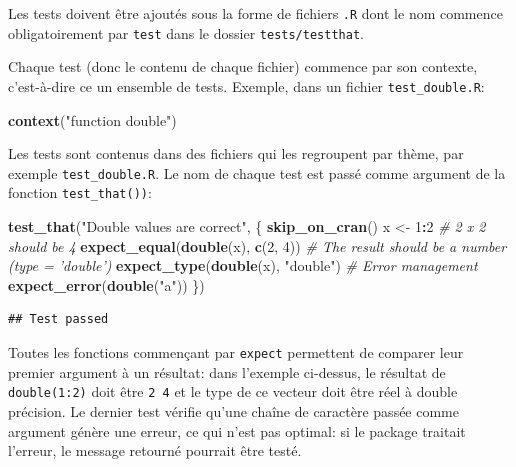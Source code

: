 \documentclass[
  12pt,
  french,
  a4paper,
  extrafontsizes,onecolumn,openright
  ]{memoir}
\newenvironment{Shaded}{\begin{snugshade}}{\end{snugshade}}
\newcommand{\CommentTok}[1]{\textcolor[rgb]{0.56,0.35,0.01}{\textit{#1}}}
\newcommand{\DecValTok}[1]{\textcolor[rgb]{0.00,0.00,0.81}{#1}}
\newcommand{\KeywordTok}[1]{\textcolor[rgb]{0.13,0.29,0.53}{\textbf{#1}}}
\newcommand{\NormalTok}[1]{#1}
\newcommand{\OperatorTok}[1]{\textcolor[rgb]{0.81,0.36,0.00}{\textbf{#1}}}
\newcommand{\StringTok}[1]{\textcolor[rgb]{0.31,0.60,0.02}{#1}}
\begin{document}
\normalsize

Les tests doivent être ajoutés sous la forme de fichiers \texttt{.R} dont le nom commence obligatoirement par \texttt{test} dans le dossier \texttt{tests/testthat}.

Chaque test (donc le contenu de chaque fichier) commence par son contexte, c'est-à-dire ce un ensemble de tests. Exemple, dans un fichier \texttt{test\_double.R}:

\scriptsize

\begin{Shaded}
\begin{Highlighting}[]
\KeywordTok{context}\NormalTok{(}\StringTok{"function double"}\NormalTok{)}
\end{Highlighting}
\end{Shaded}

\normalsize

Les tests sont contenus dans des fichiers qui les regroupent par thème, par exemple \texttt{test\_double.R}.
Le nom de chaque test est passé comme argument de la fonction \texttt{test\_that())}:

\scriptsize

\begin{Shaded}
\begin{Highlighting}[]
\KeywordTok{test_that}\NormalTok{(}\StringTok{"Double values are correct"}\NormalTok{, \{}
    \KeywordTok{skip_on_cran}\NormalTok{()}
\NormalTok{    x <-}\StringTok{ }\DecValTok{1}\OperatorTok{:}\DecValTok{2}
    \CommentTok{# 2 x 2 should be 4}
    \KeywordTok{expect_equal}\NormalTok{(}\KeywordTok{double}\NormalTok{(x), }\KeywordTok{c}\NormalTok{(}\DecValTok{2}\NormalTok{, }\DecValTok{4}\NormalTok{))}
    \CommentTok{# The result should be a number (type = 'double')}
    \KeywordTok{expect_type}\NormalTok{(}\KeywordTok{double}\NormalTok{(x), }\StringTok{"double"}\NormalTok{)}
    \CommentTok{# Error management}
    \KeywordTok{expect_error}\NormalTok{(}\KeywordTok{double}\NormalTok{(}\StringTok{"a"}\NormalTok{))}
\NormalTok{\})}
\end{Highlighting}
\end{Shaded}

\begin{verbatim}
## Test passed
\end{verbatim}

\normalsize

Toutes les fonctions commençant par \texttt{expect} permettent de comparer leur premier argument à un résultat: dans l'exemple ci-dessus, le résultat de \texttt{double(1:2)} doit être \texttt{2\ 4} et le type de ce vecteur doit être réel à double précision.
Le dernier test vérifie qu'une chaîne de caractère passée comme argument génère une erreur, ce qui n'est pas optimal: si le package traitait l'erreur, le message retourné pourrait être testé.
\end{document}
